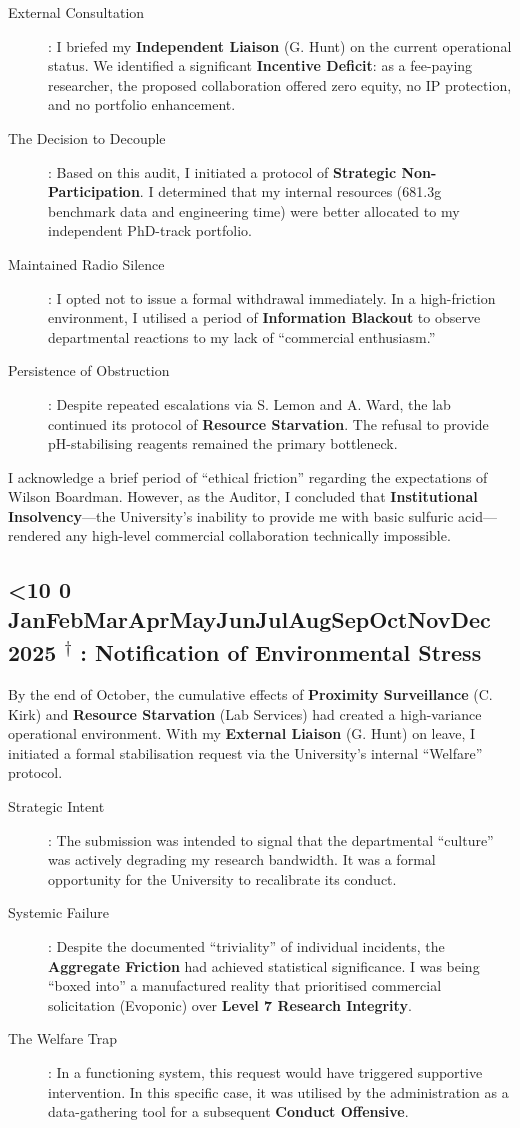 \documentclass{EMBASSY}
\DeclareRobustCommand{\gmt}[3]{%
    \texorpdfstring{%
        {\color{DateGold}\textbf{%
            \ifnum#1<10 0\fi#1\,\textperiodcentered\,%
            \ifcase#2\or Jan\or Feb\or Mar\or Apr\or May\or Jun\or Jul\or Aug\or Sep\or Oct\or Nov\or Dec\fi
            \,\textperiodcentered\,20#3%
            \textsuperscript{$\dagger$}%
        }}%
    }{%
        (#1/#2/#3)%
    }%
}
\begin{document}
\begin{description}
	\item[External Consultation]: I briefed my \textbf{Independent Liaison} (G. Hunt) on the current operational status. We identified a significant \textbf{Incentive Deficit}: as a fee-paying researcher, the proposed collaboration offered zero equity, no IP protection, and no portfolio enhancement.
	\item[The Decision to Decouple]: Based on this audit, I initiated a protocol of \textbf{Strategic Non-Participation}. I determined that my internal resources (681.3g benchmark data and engineering time) were better allocated to my independent PhD-track portfolio.
	\item[Maintained Radio Silence]: I opted not to issue a formal withdrawal immediately. In a high-friction environment, I utilised a period of \textbf{Information Blackout} to observe departmental reactions to my lack of ``commercial enthusiasm.''
	\item[Persistence of Obstruction]: Despite repeated escalations via S. Lemon and A. Ward, the lab continued its protocol of \textbf{Resource Starvation}. The refusal to provide pH-stabilising reagents remained the primary bottleneck.
\end{description}

\noindent I acknowledge a brief period of ``ethical friction'' regarding the expectations of Wilson Boardman. However, as the Auditor, I concluded that \textbf{Institutional Insolvency}---the University's inability to provide me with basic sulfuric acid---rendered any high-level commercial collaboration technically impossible.

\subsection{\gmt{31}{10}{25}: Notification of Environmental Stress}
By the end of October, the cumulative effects of \textbf{Proximity Surveillance} (C. Kirk) and \textbf{Resource Starvation} (Lab Services) had created a high-variance operational environment. With my \textbf{External Liaison} (G. Hunt) on leave, I initiated a formal stabilisation request via the University’s internal ``Welfare'' protocol.

\begin{description}
	\item[Strategic Intent]: The submission was intended to signal that the departmental ``culture'' was actively degrading my research bandwidth. It was a formal opportunity for the University to recalibrate its conduct.
	\item[Systemic Failure]: Despite the documented ``triviality'' of individual incidents, the \textbf{Aggregate Friction} had achieved statistical significance. I was being ``boxed into'' a manufactured reality that prioritised commercial solicitation (Evoponic) over \textbf{Level 7 Research Integrity}.
	\item[The Welfare Trap]: In a functioning system, this request would have triggered supportive intervention. In this specific case, it was utilised by the administration as a data-gathering tool for a subsequent \textbf{Conduct Offensive}.
\end{description}
\end{document}
